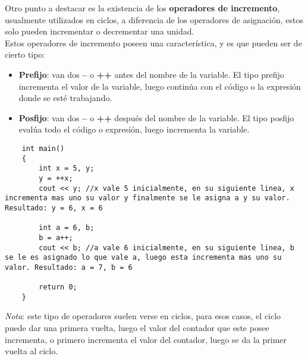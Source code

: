 Otro punto a destacar es la existencia de los \textbf{operadores de incremento}, usualmente utilizados en ciclos, a diferencia de los operadores de asignación, estos solo pueden incrementar o decrementar  una unidad.\\
Estos operadores de incremento poseen una característica, y es que pueden ser de cierto tipo:
\begin{itemize}
    \item \textbf{Prefijo}: van dos \textbf{--} o \textbf{++} antes del nombre de la variable. El tipo prefijo incrementa el valor de la variable, luego continúa con el código o la expresión donde se esté trabajando.
    \item \textbf{Posfijo}: van dos \textbf{--} o \textbf{++} después del nombre de la variable. El tipo posfijo evalúa todo el código o expresión, luego incrementa la variable.
\end{itemize}
\begin{lstlisting}
    int main()
    {
        int x = 5, y;
        y = ++x;
        cout << y; //x vale 5 inicialmente, en su siguiente linea, x incrementa mas uno su valor y finalmente se le asigna a y su valor. Resultado: y = 6, x = 6
        
        int a = 6, b;
        b = a++;
        cout << b; //a vale 6 inicialmente, en su siguiente linea, b se le es asignado lo que vale a, luego esta incrementa mas uno su valor. Resultado: a = 7, b = 6
        
        return 0;
    }
\end{lstlisting}

\textit{Nota}: este tipo de operadores suelen verse en ciclos, para esos casos, el ciclo puede dar una primera vuelta, luego el valor del contador que este posee incrementa, o primero incrementa el valor del contador, luego se da la primer vuelta al ciclo.

